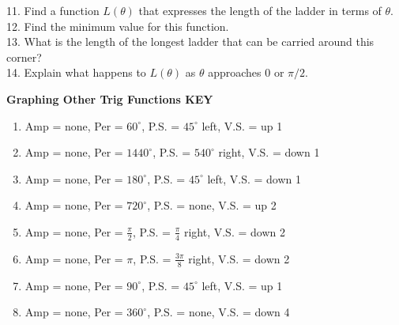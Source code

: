 \documentclass[11pt]{article}
\begin{document}
11. Find a function $L(\theta)$ that expresses the length of the ladder in terms of $\theta$.
\\[1.5in]


12. Find the minimum value for this function.
\\[1in]


13. What is the length of the longest ladder that can be carried around this corner?
\\[1in]


14. Explain what happens to $L(\theta)$ as $\theta$ approaches 0 or $\pi/2$.



\newpage


\textbf{Graphing Other Trig Functions KEY}

\begin{enumerate}
    \item Amp = none, Per = $60^\circ$, P.S. = $45^\circ$ left, V.S. = up 1
    
    \item Amp = none, Per = $1440^\circ$, P.S. = $540^\circ$ right, V.S. = down 1
    
    \item Amp = none, Per = $180^\circ$, P.S. = $45^\circ$ left, V.S. = down 1
    
    \item Amp = none, Per = $720^\circ$, P.S. = none, V.S. = up 2
    
    \item Amp = none, Per = $\frac{\pi}{2}$, P.S. = $\frac{\pi}{4}$ right, V.S. = down 2
    
    \item Amp = none, Per = $\pi$, P.S. = $\frac{3\pi}{8}$ right, V.S. = down 2
    
    \item Amp = none, Per = $90^\circ$, P.S. = $45^\circ$ left, V.S. = up 1
    
    \item Amp = none, Per = $360^\circ$, P.S. = none, V.S. = down 4
    \end{enumerate}
\end{document}
